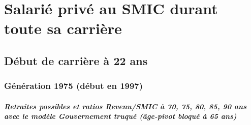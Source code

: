 \newpage 
 
\chapter{Salarié privé au SMIC durant toute sa carrière} 


 \addto{\captionsenglish}{ \renewcommand{\mtctitle}{}} \setcounter{minitocdepth}{2} 
 \minitoc \newpage 

\section{Début de carrière à 22 ans} 

\subsection{Génération 1975 (début en 1997)} 

\paragraph{Retraites possibles et ratios Revenu/SMIC à 70, 75, 80, 85, 90 ans avec le modèle \emph{Gouvernement truqué (âge-pivot bloqué à 65 ans)}}  
 
